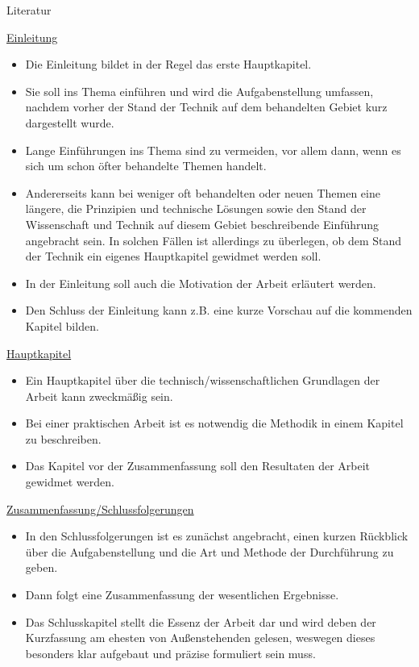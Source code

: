 \vspace{1mm}

\hspace{5mm}
Literatur

\vspace{5mm}

\underline{Einleitung}

\begin{itemize}
    \item Die Einleitung bildet in der Regel das erste Hauptkapitel.
    \item Sie soll ins Thema einführen und wird die Aufgabenstellung umfassen, nachdem vorher der Stand der Technik auf dem behandelten Gebiet kurz dargestellt wurde.
    \item Lange Einführungen ins Thema sind zu vermeiden, vor allem dann, wenn es sich um schon öfter behandelte Themen handelt.
    \item Andererseits kann bei weniger oft behandelten oder {\glqq}neuen{\grqq} Themen  eine längere, die Prinzipien und technische Lösungen sowie den Stand der Wissenschaft und Technik auf diesem Gebiet beschreibende Einführung angebracht sein. In solchen Fällen ist allerdings zu überlegen, ob dem Stand der Technik ein eigenes Hauptkapitel gewidmet werden soll.
    \item In der Einleitung soll auch die Motivation der Arbeit erläutert werden.
    \item Den Schluss der Einleitung kann z.B. eine kurze Vorschau auf die kommenden Kapitel bilden.
\end{itemize}

\underline{Hauptkapitel}

\begin{itemize}
    \item Ein Hauptkapitel über die technisch/wissenschaftlichen Grundlagen der Arbeit kann zweckmäßig sein.
    \item Bei einer praktischen Arbeit ist es notwendig die Methodik in einem Kapitel zu beschreiben.
    \item Das Kapitel vor der Zusammenfassung soll den Resultaten der Arbeit gewidmet werden.
\end{itemize}

\vspace{5mm}

\underline{Zusammenfassung/Schlussfolgerungen}

\begin{itemize}
    \item In den Schlussfolgerungen ist es zunächst angebracht, einen kurzen Rückblick über die Aufgabenstellung und die Art und Methode der Durchführung zu geben.
    \item Dann folgt eine Zusammenfassung der wesentlichen Ergebnisse.
    \item Das Schlusskapitel stellt die Essenz der Arbeit dar und wird deben der Kurzfassung am ehesten von Außenstehenden gelesen, weswegen dieses besonders klar aufgebaut und präzise formuliert sein muss.
\end{itemize}

